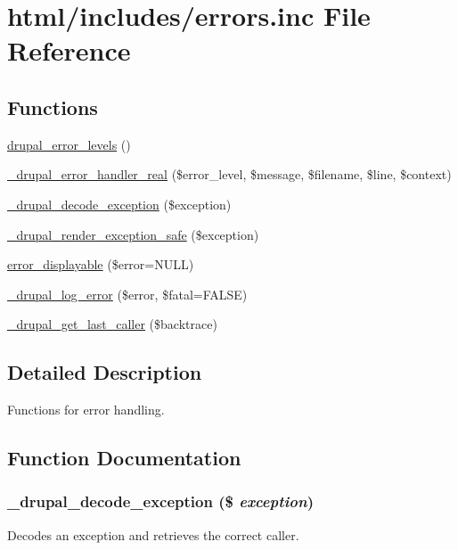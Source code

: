 \hypertarget{errors_8inc}{
\section{html/includes/errors.inc File Reference}
\label{errors_8inc}
}
\subsection*{Functions}
\begin{DoxyCompactItemize}
\item 
\hyperlink{group__logging__severity__levels_gaa3c430d607b6666eb39e5df2937f0f03}{drupal\_\-error\_\-levels} ()
\item 
\hyperlink{errors_8inc_a265af3be0f1c7ec1e99c0ed8bea5b0ad}{\_\-drupal\_\-error\_\-handler\_\-real} (\$error\_\-level, \$message, \$filename, \$line, \$context)
\item 
\hyperlink{errors_8inc_ace892832385b7832c106f55f8896060d}{\_\-drupal\_\-decode\_\-exception} (\$exception)
\item 
\hyperlink{errors_8inc_a1f8bd68a322e820f9bed014cb6a9f1de}{\_\-drupal\_\-render\_\-exception\_\-safe} (\$exception)
\item 
\hyperlink{errors_8inc_a84844a457938107e0ff1a1e5393feb8e}{error\_\-displayable} (\$error=NULL)
\item 
\hyperlink{errors_8inc_adae530f2d49e1067ab4e9dd5753e387a}{\_\-drupal\_\-log\_\-error} (\$error, \$fatal=FALSE)
\item 
\hyperlink{errors_8inc_aaab8bb3b535ed8bc605afc3f28dc7809}{\_\-drupal\_\-get\_\-last\_\-caller} (\$backtrace)
\end{DoxyCompactItemize}


\subsection{Detailed Description}
Functions for error handling. 

\subsection{Function Documentation}
\hypertarget{errors_8inc_ace892832385b7832c106f55f8896060d}{
\subsubsection[{\_\-drupal\_\-decode\_\-exception}]{\setlength{\rightskip}{0pt plus 5cm}\_\-drupal\_\-decode\_\-exception (\$ {\em exception})}}
\label{errors_8inc_ace892832385b7832c106f55f8896060d}
Decodes an exception and retrieves the correct caller.


